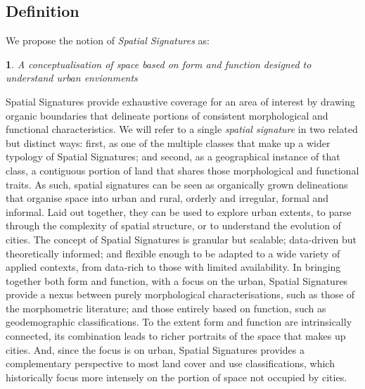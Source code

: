 \subsection{Definition}
\label{ssec:ss_def}

We propose the notion of \textit{Spatial Signatures} as:

\newtheorem*{theorem}{}
\begin{theorem}
A conceptualisation of space based on form and function designed to understand
urban envionments
\end{theorem}

Spatial Signatures provide exhaustive coverage for an area of interest by
drawing organic boundaries that delineate portions of consistent morphological
and functional characteristics.
%
We will refer to a single \textit{spatial signature} in two related but
distinct ways: first, as one of the multiple classes that make up a wider
typology of Spatial Signatures; and second, as a geographical instance of that
class, a contiguous portion of land that shares those morphological and
functional traits.
As such, spatial signatures can be seen as organically grown delineations that
organise space into urban and rural, orderly and irregular, formal and informal.
%
Laid out together, they can be used to explore urban extents, to parse through
the complexity of spatial structure, or to understand the evolution of cities.
The concept of Spatial Signatures is granular but scalable; data-driven but
theoretically informed; and flexible enough to be adapted to a wide variety of
applied contexts, from data-rich to those with limited availability.
In bringing together both form and function, with a focus on the urban,
Spatial Signatures provide a nexus between purely morphological
characterisations, such as those of the morphometric literature; and those
entirely based on function, such as geodemographic classifications.
%
To the extent form and function are intrinsically connected, its
combination leads to richer portraits of the space that makes up cities.
And, since the focus is on urban, Spatial Signatures provides a complementary
perspective to most land cover and use classifications, which historically
focus more intensely on the portion of space not occupied by cities.

